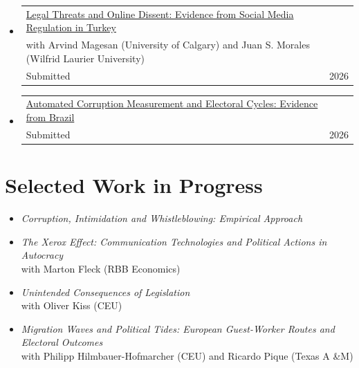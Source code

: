 \documentclass[10pt, a4paper]{article}
\makeatletter
\newcommand{\sans}{\fontfamily{phv}\selectfont}
\newcommand{\cvyear}[1]{%
  {\sans\fontsize{7.5}{9}\selectfont\color{inkfaint}#1}%
}
\newcommand{\cventry}[2]{%
  \noindent
  \begin{tabularx}{\textwidth}{@{}X@{\hspace{1em}}r@{}}
    #1 & \cvyear{#2}
  \end{tabularx}\vspace{1pt}%
}
\makeatother
\begin{document}
\begin{itemize}

\item \cventry{%
  \href{https://www.ifo.de/DocDL/cesifo1_wp12873.pdf}{Legal Threats and Online Dissent: Evidence from Social Media Regulation in Turkey}\\[-2pt]

    {\small\color{inklight} with Arvind Magesan (University of Calgary) and Juan S. Morales (Wilfrid Laurier University)}\\
    
  {\small\color{inklight}Submitted} 

}{2026} 


\item \cventry{%
  \href{https://osf.io/preprints/socarxiv/cftvk_v2}{Automated Corruption Measurement and Electoral Cycles: Evidence from Brazil}\\[-2pt]
  {\small\color{inklight}Submitted}
}{2026}




\end{itemize}

\newpage

\section{Selected Work in Progress}

\begin{itemize}

\item \textit{Corruption, Intimidation and Whistleblowing: Empirical Approach}\\
 
\item \textit{The Xerox Effect: Communication Technologies and Political Actions in Autocracy}\\
  {\small\color{inklight}with Marton Fleck (RBB Economics)}
  

\item \textit{Unintended Consequences of Legislation}\\
  {\small\color{inklight}with Oliver Kiss (CEU)}


\item \textit{Migration Waves and Political Tides: European Guest-Worker Routes and Electoral Outcomes}\\
  {\small\color{inklight}with Philipp Hilmbauer-Hofmarcher (CEU) and Ricardo Pique (Texas A \&M)}

\end{itemize}
\end{document}
